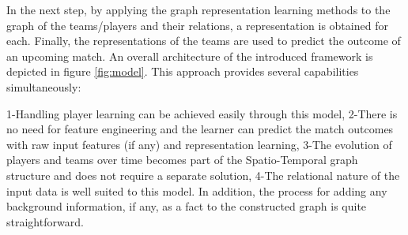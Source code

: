 \documentclass{article}
\begin{document}
In the next step, by applying the graph representation learning methods to the graph of the teams/players and their relations, a representation is obtained for each. Finally, the representations of the teams are used to predict the outcome of an upcoming match. An overall architecture of the introduced framework is depicted in figure \ref{fig:model}.
This approach provides several capabilities simultaneously: 

 1-Handling player learning can be achieved easily through this model, 2-There is no need for feature engineering and the learner can predict the match outcomes with raw input features (if any) and representation learning, 3-The evolution of players and teams over time becomes part of the Spatio-Temporal graph structure and does not require a separate solution, 4-The relational nature of the input data is well suited to this model. In addition, the process for adding any background information, if any, as a fact to the constructed graph is quite straightforward. 


\end{document}
